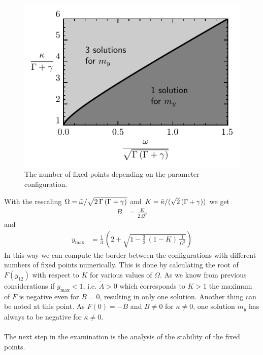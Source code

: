\documentclass{article}
\begin{document}
\begin{figure}
    \includegraphics{pictures/numb_fixp.pdf}
    \vspace*{-2cm}\caption{The number of fixed points depending on the parameter configuration.}
    \label{fig:numb_fixp}
\end{figure}
With the rescaling $\Omega=\tilde{\omega}/\sqrt{2\,\Gamma\,(\Gamma+\gamma)}$ and $K=\tilde{\kappa}/(\sqrt{2}\,(\Gamma+\gamma))$ we get
\begin{align*}
    B&=\frac{K}{2\,\Omega^2}
\end{align*}
and
\begin{align*}
    y_\text{max}&=\frac{1}{3}\,\left( 2+ \sqrt{1-\frac{3}{2}\,(1-K)\,\frac{1}{\Omega^2}}  \right)
\end{align*}
In this way we can compute the border between the configurations with different numbers of fixed points numerically. This is done by calculating the root of $F(y_{12})$ with respect to $K$ for various values of $\Omega$. As we know from previous considerations if $y_\text{max}<1$, i.e. $\tilde{A}>0$ which corresponds to $K>1$ the maximum of $F$ is negative even for $B=0$, resulting in only one solution. Another thing can be noted at this point. As $F(0)=-B$ and $B\neq0$ for $\kappa\neq0$, one solution $m_y$ has always to be negative for $\kappa\neq0$.\\\\
The next step in the examination is the analysis of the stability of the fixed points.
\end{document}

